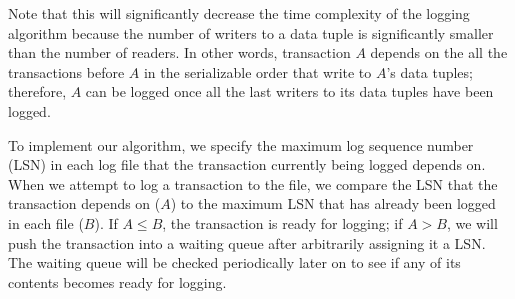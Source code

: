 Note that this will significantly decrease the time complexity of the logging algorithm because the number of writers to a data tuple is significantly smaller than the number of readers. In other words, transaction $A$ depends on the all the transactions before $A$ in the serializable order that write to $A$'s data tuples; therefore, $A$ can be logged once all the last writers to its data tuples have been logged. \par

To implement our algorithm, we specify the maximum log sequence number (LSN) in each log file that the transaction currently being logged depends on. When we attempt to log a transaction to the file, we compare the LSN that the transaction depends on ($A$) to the maximum LSN that has already been logged in each file ($B$). If $A\leq B$, the transaction is ready for logging; if $A>B$, we will push the transaction into a waiting queue after arbitrarily assigning it a LSN. The waiting queue will be checked periodically later on to see if any of its contents becomes ready for logging.\par

